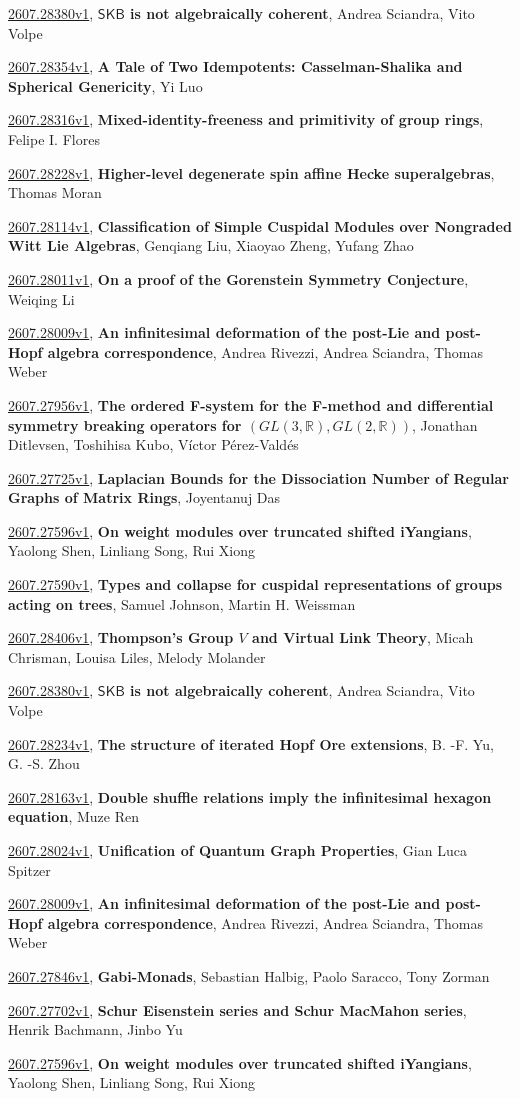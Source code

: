 \documentclass[9pt, a4paper]{article}
\theoremstyle{plain}
\theoremstyle{definition}
\theoremstyle{remark}
\newcommand{\arxiv}[3]{\href{https://arxiv.org/abs/#1}{#1}, \textbf{\textcolor{arxivblue}{#2}}, #3}
\begin{document}
\arxiv{2607.28380v1}{$\mathsf{SKB}$ is not algebraically coherent}{Andrea Sciandra, Vito Volpe}

\arxiv{2607.28354v1}{A Tale of Two Idempotents: Casselman-Shalika and Spherical Genericity}{Yi Luo}

\arxiv{2607.28316v1}{Mixed-identity-freeness and primitivity of group rings}{Felipe I. Flores}

\arxiv{2607.28228v1}{Higher-level degenerate spin affine Hecke superalgebras}{Thomas Moran}

\arxiv{2607.28114v1}{Classification of Simple Cuspidal Modules over Nongraded Witt Lie Algebras}{Genqiang Liu, Xiaoyao Zheng, Yufang Zhao}

\arxiv{2607.28011v1}{On a proof of the Gorenstein Symmetry Conjecture}{Weiqing Li}

\arxiv{2607.28009v1}{An infinitesimal deformation of the post-Lie and post-Hopf algebra correspondence}{Andrea Rivezzi, Andrea Sciandra, Thomas Weber}

\arxiv{2607.27956v1}{The ordered F-system for the F-method and differential symmetry breaking operators for $(GL(3,\mathbb{R}), GL(2,\mathbb{R}))$}{Jonathan Ditlevsen, Toshihisa Kubo, Víctor Pérez-Valdés}

\arxiv{2607.27725v1}{Laplacian Bounds for the Dissociation Number of Regular Graphs of Matrix Rings}{Joyentanuj Das}

\arxiv{2607.27596v1}{On weight modules over truncated shifted iYangians}{Yaolong Shen, Linliang Song, Rui Xiong}

\arxiv{2607.27590v1}{Types and collapse for cuspidal representations of groups acting on trees}{Samuel Johnson, Martin H. Weissman}

\arxiv{2607.28406v1}{Thompson's Group $V$ and Virtual Link Theory}{Micah Chrisman, Louisa Liles, Melody Molander}

\arxiv{2607.28380v1}{$\mathsf{SKB}$ is not algebraically coherent}{Andrea Sciandra, Vito Volpe}

\arxiv{2607.28234v1}{The structure of iterated Hopf Ore extensions}{B. -F. Yu, G. -S. Zhou}

\arxiv{2607.28163v1}{Double shuffle relations imply the infinitesimal hexagon equation}{Muze Ren}

\arxiv{2607.28024v1}{Unification of Quantum Graph Properties}{Gian Luca Spitzer}

\arxiv{2607.28009v1}{An infinitesimal deformation of the post-Lie and post-Hopf algebra correspondence}{Andrea Rivezzi, Andrea Sciandra, Thomas Weber}

\arxiv{2607.27846v1}{Gabi-Monads}{Sebastian Halbig, Paolo Saracco, Tony Zorman}

\arxiv{2607.27702v1}{Schur Eisenstein series and Schur MacMahon series}{Henrik Bachmann, Jinbo Yu}

\arxiv{2607.27596v1}{On weight modules over truncated shifted iYangians}{Yaolong Shen, Linliang Song, Rui Xiong}

\end{document}
